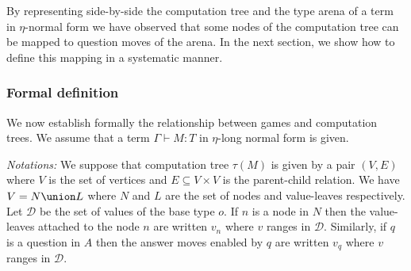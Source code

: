 By representing side-by-side the computation tree and the type arena of a term in $\eta$-normal form we have observed
that some nodes of the computation tree can be mapped to question moves of the arena.
In the next section, we show how to define this mapping in a systematic manner.

\subsubsection{Formal definition}

We now establish formally the relationship between games and
computation trees. We assume that a term $\Gamma \vdash M : T$ in $\eta$-long
normal form is given.

\emph{Notations:} We suppose that computation tree $\tau(M)$ is given by
a pair $(V,E)$ where $V$ is the set of vertices and $E \subseteq
V \times V$ is the parent-child relation. We have $V = N \union L$
where $N$ and $L$ are the set of nodes and value-leaves respectively.
Let $\mathcal{D}$ be the set of values of the base type $o$. If $n$
is a node in $N$ then the value-leaves attached to the node $n$ are
written $v_n$ where $v$ ranges in $\mathcal{D}$. Similarly, if $q$
is a question in $A$ then the answer moves enabled by $q$ are
written $v_q$ where $v$ ranges in $\mathcal{D}$.

